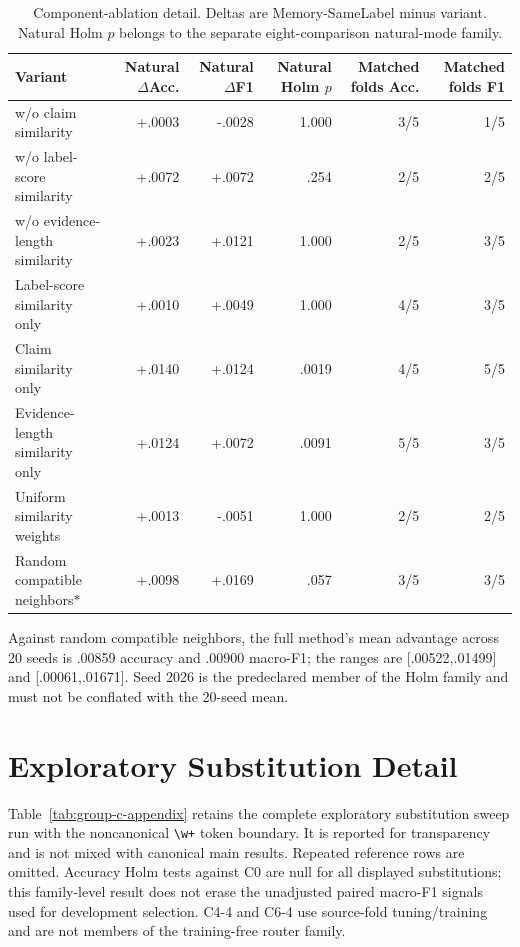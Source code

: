 \documentclass[runningheads]{llncs}
\begin{document}
\begin{table}[t]
\caption{Component-ablation detail. Deltas are Memory-SameLabel minus variant. Natural
Holm $p$ belongs to the separate eight-comparison natural-mode family.}
\label{tab:component-appendix}
\centering\scriptsize
\begin{tabular}{lrrrrr}
\toprule
Variant & Natural $\Delta$Acc. & Natural $\Delta$F1 & Natural Holm $p$ & Matched folds Acc. & Matched folds F1 \\
\midrule
w/o claim similarity & +.0003 & -.0028 & 1.000 & 3/5 & 1/5 \\
w/o label-score similarity & +.0072 & +.0072 & .254 & 2/5 & 2/5 \\
w/o evidence-length similarity & +.0023 & +.0121 & 1.000 & 2/5 & 3/5 \\
Label-score similarity only & +.0010 & +.0049 & 1.000 & 4/5 & 3/5 \\
Claim similarity only & +.0140 & +.0124 & .0019 & 4/5 & 5/5 \\
Evidence-length similarity only & +.0124 & +.0072 & .0091 & 5/5 & 3/5 \\
Uniform similarity weights & +.0013 & -.0051 & 1.000 & 2/5 & 2/5 \\
Random compatible neighbors$\ast$ & +.0098 & +.0169 & .057 & 3/5 & 3/5 \\
\bottomrule
\end{tabular}
\end{table}

Against random compatible neighbors, the full method's mean advantage across 20 seeds is .00859 accuracy
and .00900 macro-F1; the ranges are [.00522,.01499] and [.00061,.01671]. Seed
2026 is the predeclared member of the Holm family and must not be conflated
with the 20-seed mean.

\section{Exploratory Substitution Detail}
\label{sec:group-c-detail}

Table~\ref{tab:group-c-appendix} retains the complete exploratory substitution
sweep run with the noncanonical \texttt{\textbackslash w+} token boundary. It is
reported for transparency and is not mixed with canonical main results.
Repeated reference rows are omitted. Accuracy Holm tests
against C0 are null for all displayed substitutions; this family-level result
does not erase the unadjusted paired macro-F1 signals used for development
selection. C4-4 and C6-4 use source-fold tuning/training and are not members of
the training-free router family.
\end{document}

